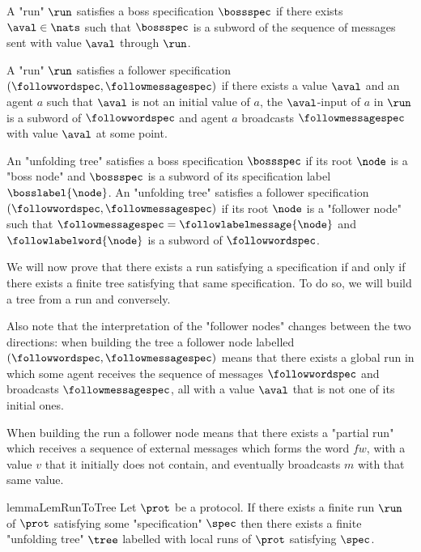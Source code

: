 

\begin{definition}
	A "run" $\run$ satisfies a boss specification $\bossspec$ if there exists $\aval \in \nats$ such that $\bossspec$ is a subword of the sequence of messages sent with value $\aval$ through $\run$.
	
	A "run" $\run$ satisfies a follower specification $(\followwordspec, \followmessagespec)$ if there exists a value $\aval$ and an agent $a$ such that $\aval$ is not an initial value of $a$, the $\aval$-input of $a$ in $\run$ is a subword of $\followwordspec$ and agent $a$ broadcasts $\followmessagespec$ with value $\aval$ at some point.
	
	An "unfolding tree" satisfies a boss specification $\bossspec$ if its root $\node$ is a "boss node" and $\bossspec$ is a subword of its specification label $\bosslabel{\node}$.
	An "unfolding tree" satisfies a follower specification $(\followwordspec, \followmessagespec)$ if its root $\node$ is a "follower node" such that $\followmessagespec=\followlabelmessage{\node}$ and  $\followlabelword{\node}$ is a subword of $\followwordspec$.
\end{definition}

We will now prove that there exists a run satisfying a specification if and only if there exists a finite tree satisfying that same specification. To do so, we will build a tree from a run and conversely.


Also note that the interpretation of the "follower nodes" changes between the two directions: when building the tree a follower node labelled $(\followwordspec, \followmessagespec)$ means that there exists a global run in which some agent receives the sequence of messages $\followwordspec$ and broadcasts $\followmessagespec$, all with a value $\aval$ that is not one of its initial ones.

When building the run a follower node means that there exists a "partial run" which receives a sequence of external messages which forms the word $fw$, with a value $v$ that it initially does not contain, and eventually broadcasts $m$ with that same value.

\begin{restatable}{lemma}{LemRunToTree}
	\label{lem:run-to-tree}
	Let $\prot$ be a protocol.
	If there exists a finite run $\run$ of $\prot$ satisfying some "specification" $\spec$ then there exists a finite "unfolding tree" $\tree$ labelled with local runs of $\prot$ satisfying $\spec$. 
\end{restatable}

